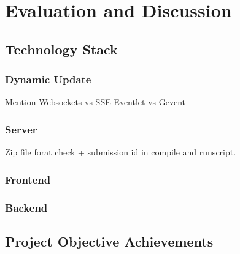 \chapter{Evaluation and Discussion}

\section{Technology Stack}
\label{sec:eval-tech}

\subsection{Dynamic Update}
Mention Websockets vs SSE
Eventlet vs Gevent

\subsection{Server}
Zip file forat check + submission id in compile and runscript.

\subsection{Frontend}

\subsection{Backend}

\section{Project Objective Achievements}

